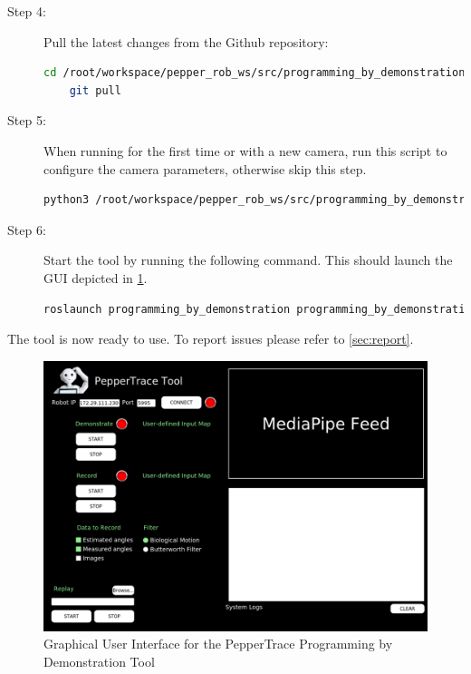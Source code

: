 \documentclass{CSSRforAfrica}
\begin{document}
\begin{description}
    \item[Step 4:] Pull the latest changes from the Github repository:
        \begin{lstlisting}[style=withoutNumbering, language=bash]
    cd /root/workspace/pepper_rob_ws/src/programming_by_demonstration 
    git pull
        \end{lstlisting}
        
    \item[Step 5:] When running for the first time or with a new camera, run this script to configure the camera parameters, otherwise skip this step.
        \begin{lstlisting}[style=withoutNumbering, language=bash]
    python3 /root/workspace/pepper_rob_ws/src/programming_by_demonstration skeletal_model/config/set_camera_intrinsics.py
        \end{lstlisting}
        
    \item[Step 6:] Start the tool by running the following command. This should launch the GUI depicted in \cref{fig:gui}. 
        \begin{lstlisting}[style=withoutNumbering, language=bash]
    roslaunch programming_by_demonstration programming_by_demonstration.launch
        \end{lstlisting}
    
\end{description}
    
The tool is now ready to use. To report issues please refer to \cref{sec:report}.

\begin{figure}[htb]
    \centering
    \includegraphics[width=\linewidth]{figures/peppertrace_gui.png}
    \caption{Graphical User Interface for the PepperTrace Programming by Demonstration Tool}
    \label{fig:gui}
\end{figure}
    
\end{document}
